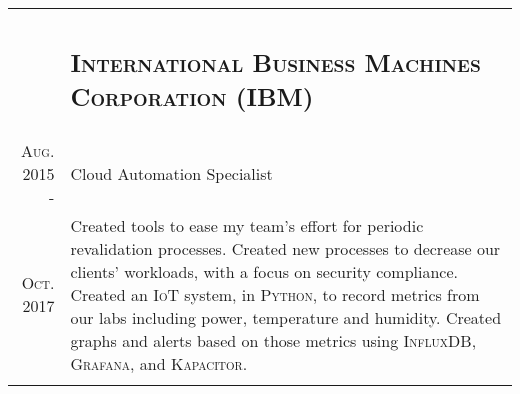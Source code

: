 \documentclass[letterpaper,10pt]{article}
\newenvironment{table_itemize}
{
	\begingroup
	\begin{minipage}[t]{\hsize}
	\footnotesize
	\raggedright
    \begin{itemize}
	\itemsep 0pt
}{
	\end{itemize}
	\end{minipage}
	\smallskip
	\endgroup
}
\begin{document}
\begin{tabular}{R|B}
	                                & \subsection{\textsc{International Business Machines Corporation (IBM)}}                        \\

	\textsc{Aug.} 2015 -            & Cloud Automation Specialist                                                                    \\
	\textsc{Oct.} 2017\phantom{ -}  %
	                                & \footnotesize Created tools to ease my team's effort for periodic revalidation processes.
	Created new processes to decrease our clients' workloads, with a focus on security compliance. Created an \textsc{IoT} system,
	in \textsc{Python}, to record metrics from our labs including power, temperature and humidity. Created graphs and alerts based
	on those metrics using \textsc{InfluxDB}, \textsc{Grafana}, and \textsc{Kapacitor}.                                              \\
	                                                                                                             \\




\end{tabular}
\end{document}
